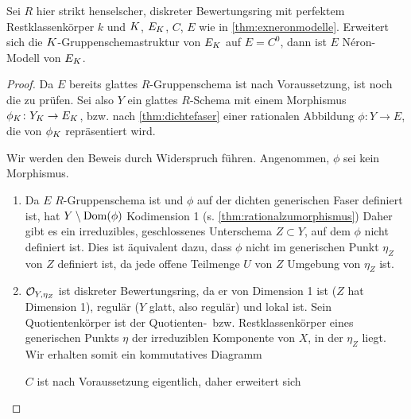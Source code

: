 \documentclass[german]{scrreprt}
\begin{document}
\begin{Lemma}\label{thm:fallstriktehenselisierung}
  Sei $R$ hier strikt henselscher, diskreter Bewertungsring mit
  perfektem Restklassenkörper $k$
  und $K$, $E_{K}$, $C$, $E$ wie in \autoref{thm:exneronmodelle}.
  Erweitert sich die $K$-Gruppenschemastruktur von $E_{K}$ auf
  $E=C^0$, dann ist $E$ Néron-Modell von $E_{K}$.
  \begin{proof}
    Da $E$ bereits glattes $R$-Gruppenschema ist nach Voraussetzung,
    ist noch die \NAbbEig zu prüfen.
    Sei also $Y$ ein glattes $R$-Schema mit einem Morphismus
    $\phi_{K}\colon Y_{K}\to E_{K}$, bzw. nach \autoref{thm:dichtefaser}
    einer rationalen Abbildung $\phi\colon Y\to E$, die von $\phi_{K}$
    repräsentiert wird.

    Wir werden den Beweis durch Widerspruch führen.
    Angenommen, $\phi$ sei kein Morphismus.
    \begin{enumerate}
    \item Da $E$ $R$-Gruppenschema ist und $\phi$ auf der dichten
      generischen Faser definiert ist, hat $Y\setminus\operatorname{Dom}(\phi)$
      Kodimension 1 (s. \autoref{thm:rationalzumorphismus})
      Daher gibt es ein irreduzibles, geschlossenes Unterschema
      $Z\subset Y$, auf dem $\phi$ nicht definiert ist.
      Dies ist äquivalent dazu, dass $\phi$ nicht im generischen Punkt
      $\eta_Z$ von $Z$ definiert ist, da jede offene Teilmenge $U$ von
      $Z$ Umgebung von $\eta_Z$ ist.
    \item $\mathcal{O}_{Y,\eta_Z}$ ist diskreter Bewertungsring, da er von
      Dimension 1 ist ($Z$ hat Dimension 1), regulär ($Y$ glatt, also
      regulär) und lokal ist.
      Sein Quotientenkörper ist der Quotienten-~bzw. Restklassenkörper
      eines generischen Punkts $\eta$ der irreduziblen Komponente von
      $X$, in der $\eta_Z$ liegt. Wir erhalten somit ein kommutatives
      Diagramm
      \begin{center}
      \end{center}
      $C$ ist nach Voraussetzung eigentlich, daher erweitert sich

\end{enumerate}
\end{proof}
\end{Lemma}
\end{document}
